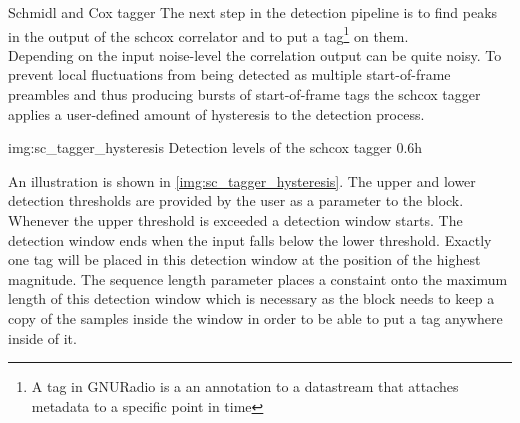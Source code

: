 \begin{subchapter}{Schmidl and Cox tagger}
  The next step in the detection pipeline is to find peaks in
  the output of the \acrlong{schcox} correlator and to put
  a tag\footnote{A tag in GNURadio is a an annotation to a
  datastream that attaches metadata to a specific point in time}
  on them. \\

  Depending on the input noise-level the correlation output
  can be quite noisy. To prevent local fluctuations from being
  detected as multiple start-of-frame preambles and thus producing
  bursts of start-of-frame tags the \acrshort{schcox} tagger
  applies a user-defined amount of hysteresis to the detection
  process.

               {img:sc_tagger_hysteresis}
               {Detection levels of the \acrshort{schcox} tagger}
               {0.6}{h}

  An illustration is shown in \autoref{img:sc_tagger_hysteresis}.
  The upper and lower detection thresholds are provided by
  the user as a parameter to the block. \\

  Whenever the upper threshold is exceeded a detection window starts.
  The detection window ends when the input falls below the lower
  threshold.
  Exactly one tag will be placed in this detection window at
  the position of the highest magnitude.
  The sequence length parameter places a constaint onto the
  maximum length of this detection window which is necessary
  as the block needs to keep a copy of the samples inside the
  window in order to be able to put a tag anywhere inside of it.
\end{subchapter}

